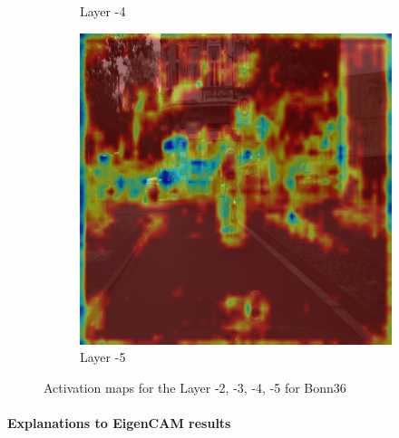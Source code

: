 \begin{figure}[h!]
\begin{subfigure}[b]{0.49\textwidth}
        \caption{Layer -4}
        \label{fig:b-4}
    \end{subfigure}
    \hfill
    \begin{subfigure}[b]{0.49\textwidth}
        \centering
        \includegraphics[width=\textwidth]{figures/bonn_000036_000019_leftImg8bit.pnglayer-5/bonn_000036_000019_leftImg8bit.png_object(0)_heatmap}
        \caption{Layer -5}
        \label{fig:b-5}
    \end{subfigure}
    \hfill

    \caption{Activation maps for the Layer -2, -3, -4, -5 for Bonn36}
    \label{fig:Bonn_000036_000019}
\end{figure}
\paragraph{Explanations to EigenCAM results}

